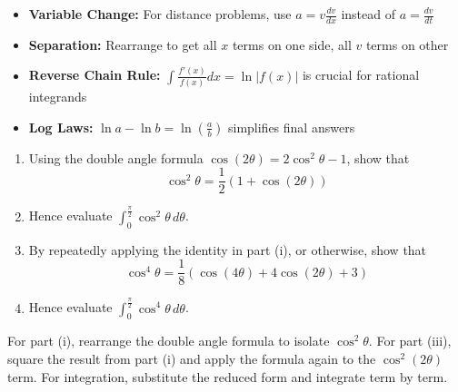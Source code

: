 \begin{takeaways}
\begin{itemize}
\item \textbf{Variable Change:} For distance problems, use $a = v\frac{dv}{dx}$ instead of $a = \frac{dv}{dt}$
\item \textbf{Separation:} Rearrange to get all $x$ terms on one side, all $v$ terms on other
\item \textbf{Reverse Chain Rule:} $\int \frac{f'(x)}{f(x)}dx = \ln|f(x)|$ is crucial for rational integrands
\item \textbf{Log Laws:} $\ln a - \ln b = \ln(\frac{a}{b})$ simplifies final answers
\end{itemize}
\end{takeaways}

\vspace{1.5cm}


\begin{problem}
\begin{enumerate}[label=(\roman*)]
\item Using the double angle formula $\cos(2\theta) = 2\cos^2\theta - 1$, show that
\[
\cos^2\theta = \frac{1}{2}(1 + \cos(2\theta))
\]
\item Hence evaluate $\displaystyle \int_0^{\frac{\pi}{2}} \cos^2\theta \, d\theta$.
\item By repeatedly applying the identity in part (i), or otherwise, show that
\[
\cos^4\theta = \frac{1}{8}(\cos(4\theta) + 4\cos(2\theta) + 3)
\]
\item Hence evaluate $\displaystyle \int_0^{\frac{\pi}{2}} \cos^4\theta \, d\theta$.
\end{enumerate}
\end{problem}

\begin{hint}
For part (i), rearrange the double angle formula to isolate $\cos^2\theta$. For part (iii), square the result from part (i) and apply the formula again to the $\cos^2(2\theta)$ term. For integration, substitute the reduced form and integrate term by term.
\end{hint}

